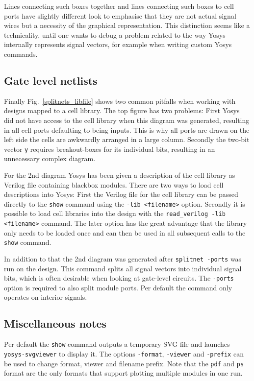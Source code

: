 \documentclass[9pt,technote,a4paper]{IEEEtran}
\begin{document}
Lines connecting such boxes together and lines connecting such boxes to cell
ports have slightly different look to emphasise that they are not actual signal
wires but a necessity of the graphical representation. This distinction seems
like a technicality, until one wants to debug a problem related to the way
Yosys internally represents signal vectors, for example when writing custom
Yosys commands.

\subsection{Gate level netlists}

Finally Fig.~\ref{splitnets_libfile} shows two common pitfalls when working
with designs mapped to a cell library. The top figure has two problems: First
Yosys did not have access to the cell library when this diagram was generated,
resulting in all cell ports defaulting to being inputs. This is why all ports
are drawn on the left side the cells are awkwardly arranged in a large column.
Secondly the two-bit vector {\tt y} requires breakout-boxes for its individual
bits, resulting in an unnecessary complex diagram.

For the 2nd diagram Yosys has been given a description of the cell library as
Verilog file containing blackbox modules. There are two ways to load cell
descriptions into Yosys: First the Verilog file for the cell library can be
passed directly to the {\tt show} command using the {\tt -lib <filename>}
option. Secondly it is possible to load cell libraries into the design with
the {\tt read\_verilog -lib <filename>} command. The later option has the great 
advantage that the library only needs to be loaded once and can then be used
in all subsequent calls to the {\tt show} command.

In addition to that the 2nd diagram was generated after {\tt splitnet -ports}
was run on the design. This command splits all signal vectors into individual
signal bits, which is often desirable when looking at gate-level circuits. The
{\tt -ports} option is required to also split module ports. Per default the
command only operates on interior signals.

\subsection{Miscellaneous notes}

Per default the {\tt show} command outputs a temporary SVG file and launches
{\tt yosys-svgviewer} to display it. The options {\tt -format}, {\tt -viewer}
and {\tt -prefix} can be used to change format, viewer and filename prefix.
Note that the {\tt pdf} and {\tt ps} format are the only formats that support
plotting multiple modules in one run.
\end{document}
